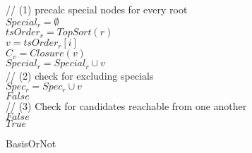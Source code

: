\documentclass{svproc}
\begin{document}
\begin{figure}[H]
	\begin{center}
		\begin{algorithm}[H]
			\SetAlgoLined
                        // (1) precalc special nodes for every root \\
                         {
                            $Special_r = \emptyset$ \\
                            $tsOrder_r = TopSort(r)$ \\
                             {
                                $v = tsOrder_r[i]$ \\
                                $C_v = Closure(v)$ \\
                                 {
                                    $Special_r = Special_r \cup v$ \\
                                }
                            }
                        }
			// (2) check for excluding specials \\
			 {
                             {
                                 {
                                    $Spec_r = Spec_r \cup v$ \\
                                     {
                                        \Return $False$ \\
                                    }
                                }
                            }
			}
                        // (3) Check for candidates reachable from one another \\
                         {
                             {
                                \Return $False$ \\
                            }
                        }
                        \Return $True$
			\label{alg:isbasis}
			\caption{BasisOrNot}
		\end{algorithm}
	\end{center}
\end{figure}
\end{document}
